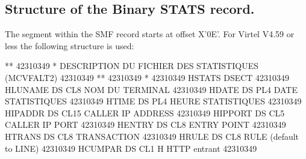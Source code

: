 \documentclass[letterpaper,10pt,english]{sphinxmanual}
\begin{document}
\subsection{Structure of the Binary STATS record.}
\label{\detokenize{audit_operations_ and_performance:structure-of-the-binary-stats-record}}
\sphinxAtStartPar
The segment within the SMF record starts at offset X’0E’. For Virtel V4.59 or less the following structure is used: \sphinxhyphen{}

\begin{sphinxVerbatim}[commandchars=\\\{\}]
*\PYGZhy{}\PYGZhy{}\PYGZhy{}\PYGZhy{}\PYGZhy{}\PYGZhy{}\PYGZhy{}\PYGZhy{}\PYGZhy{}\PYGZhy{}\PYGZhy{}\PYGZhy{}\PYGZhy{}\PYGZhy{}\PYGZhy{}\PYGZhy{}\PYGZhy{}\PYGZhy{}\PYGZhy{}\PYGZhy{}\PYGZhy{}\PYGZhy{}\PYGZhy{}\PYGZhy{}\PYGZhy{}\PYGZhy{}\PYGZhy{}\PYGZhy{}\PYGZhy{}\PYGZhy{}\PYGZhy{}\PYGZhy{}\PYGZhy{}\PYGZhy{}\PYGZhy{}\PYGZhy{}\PYGZhy{}\PYGZhy{}\PYGZhy{}\PYGZhy{}\PYGZhy{}\PYGZhy{}\PYGZhy{}\PYGZhy{}\PYGZhy{}\PYGZhy{}\PYGZhy{}\PYGZhy{}\PYGZhy{}\PYGZhy{}\PYGZhy{}\PYGZhy{}\PYGZhy{}\PYGZhy{}\PYGZhy{}\PYGZhy{}\PYGZhy{}\PYGZhy{}\PYGZhy{}\PYGZhy{}* 42310349
*        DESCRIPTION DU FICHIER DES STATISTIQUES (MCVFALT2)    42310349
*\PYGZhy{}\PYGZhy{}\PYGZhy{}\PYGZhy{}\PYGZhy{}\PYGZhy{}\PYGZhy{}\PYGZhy{}\PYGZhy{}\PYGZhy{}\PYGZhy{}\PYGZhy{}\PYGZhy{}\PYGZhy{}\PYGZhy{}\PYGZhy{}\PYGZhy{}\PYGZhy{}\PYGZhy{}\PYGZhy{}\PYGZhy{}\PYGZhy{}\PYGZhy{}\PYGZhy{}\PYGZhy{}\PYGZhy{}\PYGZhy{}\PYGZhy{}\PYGZhy{}\PYGZhy{}\PYGZhy{}\PYGZhy{}\PYGZhy{}\PYGZhy{}\PYGZhy{}\PYGZhy{}\PYGZhy{}\PYGZhy{}\PYGZhy{}\PYGZhy{}\PYGZhy{}\PYGZhy{}\PYGZhy{}\PYGZhy{}\PYGZhy{}\PYGZhy{}\PYGZhy{}\PYGZhy{}\PYGZhy{}\PYGZhy{}\PYGZhy{}\PYGZhy{}\PYGZhy{}\PYGZhy{}\PYGZhy{}\PYGZhy{}\PYGZhy{}\PYGZhy{}\PYGZhy{}\PYGZhy{}* 42310349
*                                                              42310349
HSTATS   DSECT                                                 42310349
H\PYGZdl{}LUNAME DS    CL8                     NOM DU TERMINAL         42310349
H\PYGZdl{}DATE   DS    PL4                     DATE STATISTIQUES       42310349
H\PYGZdl{}TIME   DS    PL4                     HEURE STATISTIQUES      42310349
H\PYGZdl{}IPADDR DS    CL15                    CALLER IP ADDRESS       42310349
H\PYGZdl{}IPPORT DS    CL5                     CALLER IP PORT          42310349
H\PYGZdl{}ENTRY  DS    CL8                     ENTRY POINT             42310349
H\PYGZdl{}TRANS  DS    CL8                     TRANSACTION             42310349
H\PYGZdl{}RULE   DS    CL8                     RULE (default to LINE)  42310349
H\PYGZdl{}CUMPAR DS    CL1                     H HTTP entrant          42310349

\end{sphinxVerbatim}
\end{document}
